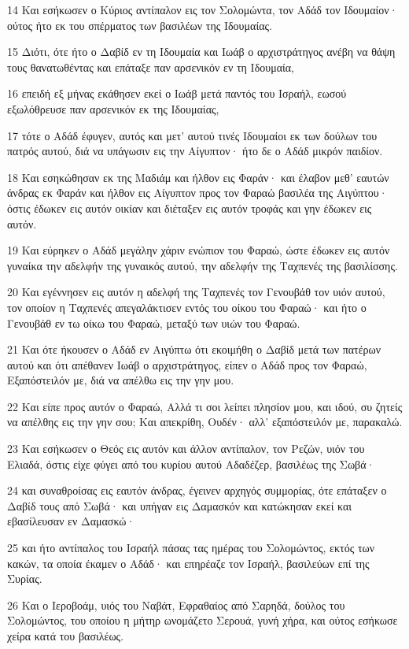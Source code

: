 \par 14 Και εσήκωσεν ο Κύριος αντίπαλον εις τον Σολομώντα, τον Αδάδ τον Ιδουμαίον· ούτος ήτο εκ του σπέρματος των βασιλέων της Ιδουμαίας.
\par 15 Διότι, ότε ήτο ο Δαβίδ εν τη Ιδουμαία και Ιωάβ ο αρχιστράτηγος ανέβη να θάψη τους θανατωθέντας και επάταξε παν αρσενικόν εν τη Ιδουμαία,
\par 16 επειδή εξ μήνας εκάθησεν εκεί ο Ιωάβ μετά παντός του Ισραήλ, εωσού εξωλόθρευσε παν αρσενικόν εκ της Ιδουμαίας,
\par 17 τότε ο Αδάδ έφυγεν, αυτός και μετ' αυτού τινές Ιδουμαίοι εκ των δούλων του πατρός αυτού, διά να υπάγωσιν εις την Αίγυπτον· ήτο δε ο Αδάδ μικρόν παιδίον.
\par 18 Και εσηκώθησαν εκ της Μαδιάμ και ήλθον εις Φαράν· και έλαβον μεθ' εαυτών άνδρας εκ Φαράν και ήλθον εις Αίγυπτον προς τον Φαραώ βασιλέα της Αιγύπτου· όστις έδωκεν εις αυτόν οικίαν και διέταξεν εις αυτόν τροφάς και γην έδωκεν εις αυτόν.
\par 19 Και εύρηκεν ο Αδάδ μεγάλην χάριν ενώπιον του Φαραώ, ώστε έδωκεν εις αυτόν γυναίκα την αδελφήν της γυναικός αυτού, την αδελφήν της Ταχπενές της βασιλίσσης.
\par 20 Και εγέννησεν εις αυτόν η αδελφή της Ταχπενές τον Γενουβάθ τον υιόν αυτού, τον οποίον η Ταχπενές απεγαλάκτισεν εντός του οίκου του Φαραώ· και ήτο ο Γενουβάθ εν τω οίκω του Φαραώ, μεταξύ των υιών του Φαραώ.
\par 21 Και ότε ήκουσεν ο Αδάδ εν Αιγύπτω ότι εκοιμήθη ο Δαβίδ μετά των πατέρων αυτού και ότι απέθανεν Ιωάβ ο αρχιστράτηγος, είπεν ο Αδάδ προς τον Φαραώ, Εξαπόστειλόν με, διά να απέλθω εις την γην μου.
\par 22 Και είπε προς αυτόν ο Φαραώ, Αλλά τι σοι λείπει πλησίον μου, και ιδού, συ ζητείς να απέλθης εις την γην σου; Και απεκρίθη, Ουδέν· αλλ' εξαπόστειλόν με, παρακαλώ.
\par 23 Και εσήκωσεν ο Θεός εις αυτόν και άλλον αντίπαλον, τον Ρεζών, υιόν του Ελιαδά, όστις είχε φύγει από του κυρίου αυτού Αδαδέζερ, βασιλέως της Σωβά·
\par 24 και συναθροίσας εις εαυτόν άνδρας, έγεινεν αρχηγός συμμορίας, ότε επάταξεν ο Δαβίδ τους από Σωβά· και υπήγαν εις Δαμασκόν και κατώκησαν εκεί και εβασίλευσαν εν Δαμασκώ·
\par 25 και ήτο αντίπαλος του Ισραήλ πάσας τας ημέρας του Σολομώντος, εκτός των κακών, τα οποία έκαμεν ο Αδάδ· και επηρέαζε τον Ισραήλ, βασιλεύων επί της Συρίας.
\par 26 Και ο Ιεροβοάμ, υιός του Ναβάτ, Εφραθαίος από Σαρηδά, δούλος του Σολομώντος, του οποίου η μήτηρ ωνομάζετο Σερουά, γυνή χήρα, και ούτος εσήκωσε χείρα κατά του βασιλέως.
